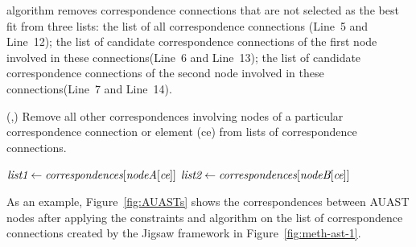  algorithm removes correspondence connections that are not selected as the best fit from three lists: the list of all correspondence connections (Line~5 and Line~12);
the list of candidate correspondence connections of the first node involved in these connections(Line~6 and Line~13); the list of candidate correspondence connections of the second node involved in these connections(Line~7 and Line~14).

\begin{algorithm}
\caption{(,) Remove all other correspondences involving nodes of a particular correspondence connection or element (ce) from lists of correspondence connections.}
\label{removeOtherCEs}
  \begin{algorithmic}[1]
  \RemoveOtherCEs
       \State $\textit{list1} \gets \textit{correspondences}[\textit{nodeA}[\textit{ce}]]$
	   \State $\textit{list2} \gets \textit{correspondences}[\textit{nodeB}[\textit{ce}]]$
	   		 \EndIf
	   \EndFor		
	 	 	 		 
	   		 \EndIf
	   \EndFor	  	
  \end{algorithmic}
\end{algorithm}

As an example, Figure~\ref{fig:AUASTs} shows the correspondences between AUAST nodes after applying the constraints and  algorithm on the list of correspondence connections created by the Jigsaw framework in Figure~\ref{fig:meth-ast-1}.

